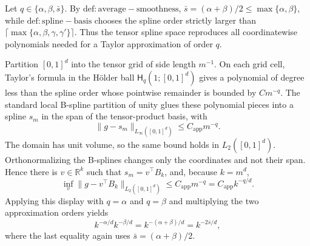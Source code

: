 Let \(q\in\{\alpha,\beta,\bar s\}\). By \(\mathrm{def:average-smoothness}\), \(\bar s=(\alpha+\beta)/2\le\max\{\alpha,\beta\}\), while \(\mathrm{def:spline-basis}\) chooses the spline order strictly larger than \(\lceil\max\{\alpha,\beta,\gamma,\gamma'\}\rceil\). Thus the tensor spline space reproduces all coordinatewise polynomials needed for a Taylor approximation of order \(q\).

Partition \([0,1]^d\) into the tensor grid of side length \(m^{-1}\). On each grid cell, Taylor's formula in the Hölder ball \(\mathsf H_q(1;[0,1]^d)\) gives a polynomial of degree less than the spline order whose pointwise remainder is bounded by \(C m^{-q}\). The standard local B-spline partition of unity glues these polynomial pieces into a spline \(s_m\) in the span of the tensor-product basis, with
\[
\|g-s_m\|_{L_\infty([0,1]^d)}\le C_{\mathrm{app}}m^{-q}.
\]
The domain has unit volume, so the same bound holds in \(L_2([0,1]^d)\). Orthonormalizing the B-splines changes only the coordinates and not their span. Hence there is \(v\in\mathbb R^k\) such that \(s_m=v^\top B_k\), and, because \(k=m^d\),
\[
\inf_v\|g-v^\top B_k\|_{L_2([0,1]^d)}
\le C_{\mathrm{app}}m^{-q}
=C_{\mathrm{app}}k^{-q/d}.
\]
Applying this display with \(q=\alpha\) and \(q=\beta\) and multiplying the two approximation orders yields
\[
k^{-\alpha/d}k^{-\beta/d}
=k^{-(\alpha+\beta)/d}
=k^{-2\bar s/d},
\]
where the last equality again uses \(\bar s=(\alpha+\beta)/2\).